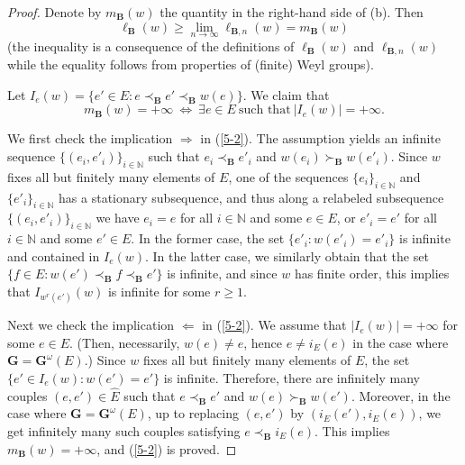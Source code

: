 \documentclass[12pt]{amsart}
\theoremstyle{definition}
\begin{document}
\begin{proof}
Denote by $m_\mathbf{B}(w)$ the quantity in the right-hand side of {\rm (b)}. Then
\begin{equation}
\label{5-1}
\ell_\mathbf{B}(w)\geq \lim_{n\to\infty}\ell_{\mathbf{B},n}(w)=m_\mathbf{B}(w)
\end{equation}
(the inequality is a consequence of the definitions of $\ell_\mathbf{B}(w)$ and $\ell_{\mathbf{B},n}(w)$ while the equality follows from properties of (finite) Weyl groups).

Let $I_e(w)=\{e'\in E:e\prec_\mathbf{B}e'\prec_\mathbf{B}w(e)\}$.
We claim that
\begin{equation}
\label{5-2}
m_\mathbf{B}(w)=+\infty\ \Leftrightarrow\ \exists e\in E\ \mbox{such that}\ |I_e(w)|=+\infty.
\end{equation}

We first check the implication $\Rightarrow$ in (\ref{5-2}). The assumption yields an infinite sequence $\{(e_i,e'_i)\}_{i\in\mathbb{N}}$ such that $e_i\prec_\mathbf{B}e'_i$ and $w(e_i)\succ_\mathbf{B}w(e'_i)$. Since $w$ fixes all but finitely many elements of $E$, one of the sequences $\{e_i\}_{i\in\mathbb{N}}$ and $\{e'_i\}_{i\in\mathbb{N}}$ has a stationary subsequence,  and thus along a relabeled subsequence $\{(e_i,e'_i)\}_{i\in\mathbb{N}}$ we have $e_i=e$ for all $i\in\mathbb{N}$ and some $e\in E$, or $e'_i=e'$ for all $i\in\mathbb{N}$ and some $e'\in E$. In the former case,
the set $\{e'_i:w(e'_i)=e'_i\}$ is infinite and contained in $I_e(w)$. In the latter case, we similarly obtain that the set $\{f\in E:w(e')\prec_\mathbf{B} f\prec_\mathbf{B} e'\}$ is infinite, and since $w$ has finite order, this implies that $I_{w^r(e')}(w)$ is infinite for some $r\geq 1$.



Next we check the implication $\Leftarrow$ in (\ref{5-2}).
We assume that $|I_e(w)|=+\infty$ for some $e\in E$.
(Then, necessarily, $w(e)\not=e$, hence $e\not=i_E(e)$ in the case where $\mathbf{G}=\mathbf{G}^\omega(E)$.)
Since $w$ fixes all but finitely many elements of $E$, the set
$\{e'\in I_e(w):w(e')=e'\}$ is infinite.
Therefore, there are infinitely many couples $(e,e')\in\hat{E}$ such that $e\prec_\mathbf{B}e'$ and $w(e)\succ_\mathbf{B}w(e')$. Moreover, in the case where $\mathbf{G}=\mathbf{G}^\omega(E)$, up to replacing $(e,e')$ by $(i_E(e'),i_E(e))$, we get infinitely many such couples satisfying $e\prec_\mathbf{B}i_E(e)$.
This implies $m_\mathbf{B}(w)=+\infty$, and (\ref{5-2}) is proved.


\end{proof}
\end{document}
